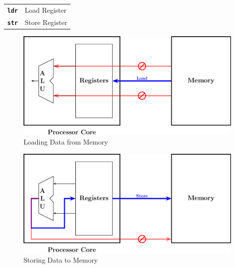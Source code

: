 \begin{table}[h!]
\begin{tabular}{ll}
	\texttt{\bf ldr} & Load Register \\
	\texttt{\bf str} & Store Register
\end{tabular}
\end{table}

\begin{figure}[h!]\centering
	\includegraphics[width=.975\textwidth]{architectures/load.pdf}
	\caption{Loading Data from Memory}
\end{figure}

\begin{figure}[h!]\centering
	\includegraphics[width=.975\textwidth]{architectures/store.pdf}
	\caption{Storing Data to Memory}
\end{figure}

